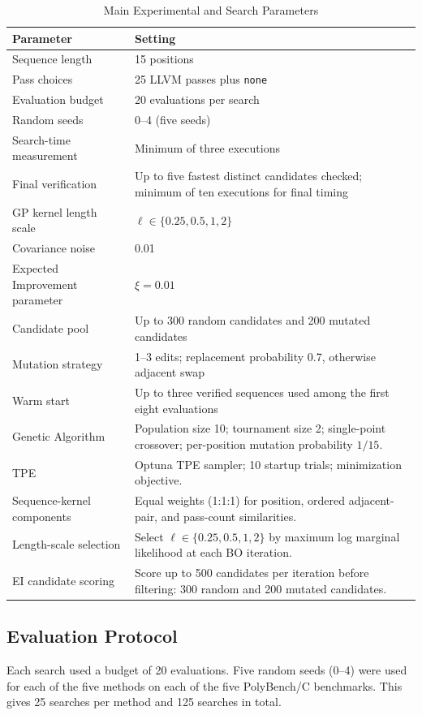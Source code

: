 \begin{table}[t]
\caption{Main Experimental and Search Parameters}
\label{tab:params}
\centering\footnotesize
\begin{tabularx}{\columnwidth}{@{}>{\raggedright\arraybackslash}p{2.2cm}X@{}}
\toprule
Parameter & Setting\\
\midrule
Sequence length & 15 positions\\
Pass choices & 25 LLVM passes plus \texttt{none}\\
Evaluation budget & 20 evaluations per search\\
Random seeds & 0--4 (five seeds)\\
Search-time measurement & Minimum of three executions\\
Final verification & Up to five fastest distinct candidates checked; minimum of ten executions for final timing\\
GP kernel length scale & $\ell \in \{0.25, 0.5, 1, 2\}$\\
Covariance noise & 0.01\\
Expected Improvement parameter & $\xi = 0.01$\\
Candidate pool & Up to 300 random candidates and 200 mutated candidates\\
Mutation strategy & 1--3 edits; replacement probability 0.7, otherwise adjacent swap\\
Warm start & Up to three verified sequences used among the first eight evaluations\\
Genetic Algorithm & Population size 10; tournament size 2; single-point crossover; per-position mutation probability $1/15$.\\
TPE & Optuna TPE sampler; 10 startup trials; minimization objective.\\
Sequence-kernel components & Equal weights (1:1:1) for position, ordered adjacent-pair, and pass-count similarities.\\
Length-scale selection & Select $\ell \in \{0.25, 0.5, 1, 2\}$ by maximum log marginal likelihood at each BO iteration.\\
EI candidate scoring & Score up to 500 candidates per iteration before filtering: 300 random and 200 mutated candidates.\\
\bottomrule
\end{tabularx}
\end{table}

\subsection{Evaluation Protocol}
Each search used a budget of 20 evaluations. Five random seeds (0--4) were used for each of the five methods on each of the five PolyBench/C benchmarks. This gives 25 searches per method and 125 searches in total.


